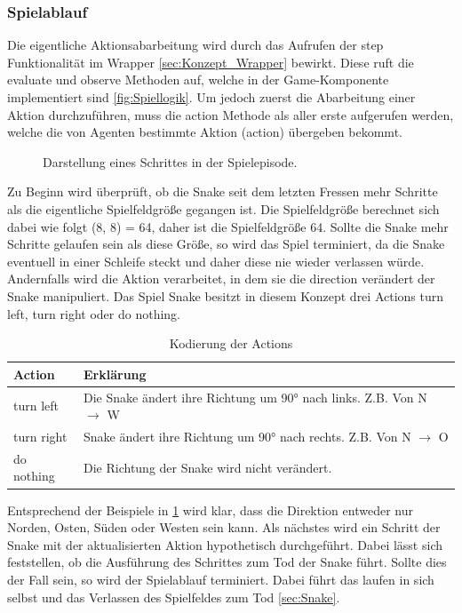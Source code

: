 \subsubsection{Spielablauf} \label{sec:Konzept_Spielablauf}
Die eigentliche Aktionsabarbeitung wird durch das Aufrufen der step Funktionalität im Wrapper \ref{sec:Konzept_Wrapper} bewirkt. Diese ruft die evaluate und observe Methoden auf, welche in der Game-Komponente implementiert sind \ref{fig:Spiellogik}.
Um jedoch zuerst die Abarbeitung einer Aktion durchzuführen, muss die action Methode als aller erste aufgerufen werden, welche die von Agenten bestimmte Aktion (action) übergeben bekommt. 
\begin{figure}[H]
	\centering
	\def\svgscale{0.105}
	
	\caption[Spielablauf]{Darstellung eines Schrittes in der Spielepisode.}
	\label{fig:Spielablauf}
\end{figure}
Zu Beginn wird überprüft, ob die Snake seit dem letzten Fressen mehr Schritte als die eigentliche Spielfeldgröße gegangen ist. Die Spielfeldgröße berechnet sich dabei wie folgt (8, 8) = 64, daher ist die Spielfeldgröße 64. Sollte die Snake mehr Schritte gelaufen sein als diese Größe, so wird das Spiel terminiert, da die Snake eventuell in einer Schleife steckt und daher diese nie wieder verlassen würde.\\
Andernfalls wird die Aktion verarbeitet, in dem sie die direction verändert der Snake manipuliert. Das Spiel Snake besitzt in diesem Konzept drei Actions turn left, turn right oder do nothing.
\begin{longtable}[h]{|p{4cm}|p{\linewidth - 5cm}|}
	\caption{Kodierung der Actions}
	\label{tab:Aktionscodierung} 
	\endfirsthead
	\endhead
	\hline
	Action & Erklärung \\
	\hline
	turn left & Die Snake ändert ihre Richtung um 90° nach links. Z.B. Von N $\longrightarrow$ W \\
	\hline
	turn right & Snake ändert ihre Richtung um 90° nach rechts. Z.B. Von N $\longrightarrow$ O \\
	\hline
	do nothing & Die Richtung der Snake wird nicht verändert. \\
	\hline
\end{longtable}
Entsprechend der Beispiele in \ref{tab:Aktionscodierung} wird klar, dass die Direktion entweder nur Norden, Osten, Süden oder Westen sein kann.
Als nächstes wird ein Schritt der Snake mit der aktualisierten Aktion hypothetisch durchgeführt. Dabei lässt sich feststellen, ob die Ausführung des Schrittes zum Tod der Snake führt. Sollte dies der Fall sein, so wird der Spielablauf terminiert. Dabei führt das laufen in sich selbst und das Verlassen des Spielfeldes zum Tod \ref{sec:Snake}. \\ 
